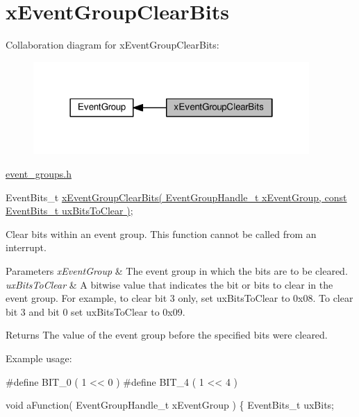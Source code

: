 \hypertarget{group__xEventGroupClearBits}{}\section{x\+Event\+Group\+Clear\+Bits}
\label{group__xEventGroupClearBits}
Collaboration diagram for x\+Event\+Group\+Clear\+Bits\+:\nopagebreak
\begin{figure}[H]
\begin{center}
\leavevmode
\includegraphics[width=298pt]{d6/dc7/group__xEventGroupClearBits}
\end{center}
\end{figure}
\hyperlink{event__groups_8h}{event\+\_\+groups.\+h} 
\begin{DoxyPre}
   EventBits\_t \hyperlink{event__groups_8h_a0fb72cfdd4f0d5f86d955fc3af448f2a}{xEventGroupClearBits( EventGroupHandle\_t xEventGroup, const EventBits\_t uxBitsToClear )};
\end{DoxyPre}


Clear bits within an event group. This function cannot be called from an interrupt.


\begin{DoxyParams}{Parameters}
{\em x\+Event\+Group} & The event group in which the bits are to be cleared.\\
\hline
{\em ux\+Bits\+To\+Clear} & A bitwise value that indicates the bit or bits to clear in the event group. For example, to clear bit 3 only, set ux\+Bits\+To\+Clear to 0x08. To clear bit 3 and bit 0 set ux\+Bits\+To\+Clear to 0x09.\\
\hline
\end{DoxyParams}
\begin{DoxyReturn}{Returns}
The value of the event group before the specified bits were cleared.
\end{DoxyReturn}
Example usage\+: 
\begin{DoxyPre}
  #define BIT\_0 ( 1 << 0 )
  #define BIT\_4 ( 1 << 4 )\end{DoxyPre}



\begin{DoxyPre}  void aFunction( EventGroupHandle\_t xEventGroup )
  \{
  EventBits\_t uxBits;\end{DoxyPre}



